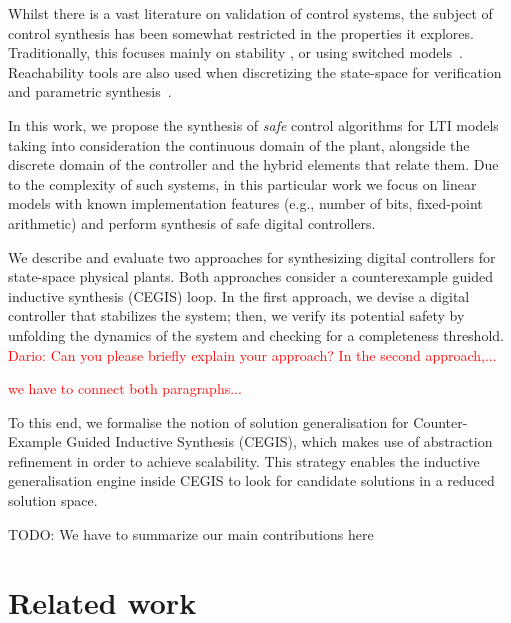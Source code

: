 \documentclass[runningheads,a4paper]{llncs}
\newcommand{\addtodo}[1]{{\color{red} TODO: #1}}
\begin{document}
Whilst there is a vast literature on validation of control systems,
the subject of control synthesis has been somewhat restricted in the
properties it explores.  Traditionally, this focuses mainly on stability %
\cite{DBLP:journals/corr/AbateBCCDKK16,sadabadi2016static}, or using switched
models~\cite{DBLP:conf/emsoft/RavanbakhshS16}.
Reachability tools are
also used when discretizing the state-space for verification and
parametric synthesis~\cite{cimatti2013parameter}.

In this work, we propose the synthesis of \emph{safe} control algorithms for
LTI models taking into consideration the continuous domain of the plant, 
alongside the discrete domain of the controller and the hybrid elements that relate them.  
Due to the complexity of such systems, in this particular work we focus
on linear models with known  implementation features (e.g., number of bits, fixed-point
arithmetic) %
and perform %
synthesis of safe digital controllers.

We describe and evaluate two approaches for synthesizing digital controllers 
for state-space physical plants. Both approaches consider a counterexample 
guided inductive synthesis (CEGIS) loop. In the first approach, 
we devise a digital controller that stabilizes the system; then, we verify its 
potential safety by unfolding the dynamics of the system and checking for 
a completeness threshold. \textcolor{red}{Dario: Can you please briefly explain your approach?
In the second approach,...}

\textcolor{red}{we have to connect both paragraphs...}

To this end, we formalise the notion of solution generalisation for
Counter-Example Guided Inductive Synthesis (CEGIS), which makes use 
of abstraction refinement in order to achieve scalability.
This strategy enables the inductive generalisation engine inside CEGIS
to look for candidate solutions in a reduced solution space.  

\addtodo{We have to summarize our main contributions here}

\section{Related work}
\label{sec:relw}
\end{document}
